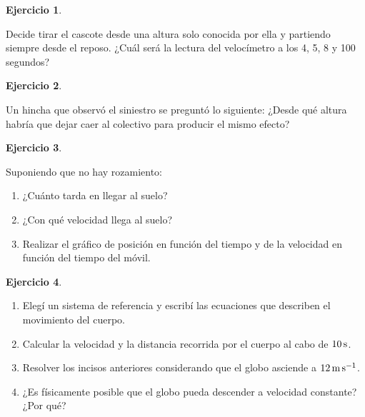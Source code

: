 \documentclass[a4paper,12pt,twoside]{book}
\newtheorem{ejercicio}{{Ejercicio}}[chapter]
\begin{document}
\begin{mdframed}[style=ejercicio-facil]
    \begin{ejercicio}
    \end{ejercicio}
    Decide tirar el cascote desde una altura solo conocida por ella y partiendo siempre desde el reposo.
    ¿Cuál será la lectura del velocímetro a los 4, 5, 8 y 100 segundos?
\end{mdframed}

\begin{mdframed}[style=ejercicio-facil]
    \begin{ejercicio}
    \end{ejercicio}
    Un hincha que observó el siniestro se preguntó lo siguiente: ¿Desde qué altura habría que dejar caer al colectivo para producir el mismo efecto?
\end{mdframed}

\begin{mdframed}[style=ejercicio-facil]
    \begin{ejercicio}
    \end{ejercicio}
    Suponiendo que no hay rozamiento:
    \begin{enumerate}
        \item ¿Cuánto tarda en llegar al suelo?
        \item ¿Con qué velocidad llega al suelo?
        \item Realizar el gráfico de posición en función del tiempo y de la velocidad en función del tiempo del móvil.
    \end{enumerate}
\end{mdframed}

\begin{mdframed}[style=ejercicio-facil]
    \begin{ejercicio}
    \end{ejercicio}
    \begin{enumerate}
        \item Elegí un sistema de referencia y escribí las ecuaciones que describen el movimiento del cuerpo.
        \item Calcular la velocidad y la distancia recorrida por el cuerpo al cabo de $10\,\si{\second}$.
        \item Resolver los incisos anteriores considerando que el globo asciende a $12\,\si{\metre\per\second}$.
        \item ¿Es físicamente posible que el globo pueda descender a velocidad constante? ¿Por qué?
    \end{enumerate}
\end{mdframed}
\end{document}
